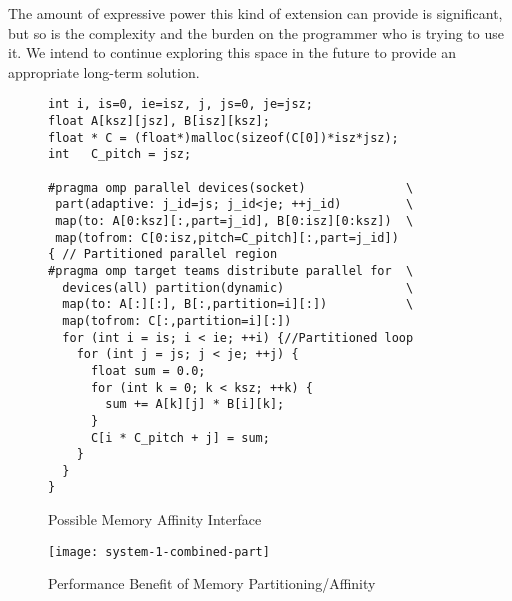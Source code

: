The amount of expressive power this kind of extension can provide is
significant, but so is the complexity and the burden on the programmer who is
trying to use it.  We intend to continue exploring this space in the future to
provide an appropriate long-term solution.

\begin{figure}
  \begin{verbatim}
int i, is=0, ie=isz, j, js=0, je=jsz;
float A[ksz][jsz], B[isz][ksz];
float * C = (float*)malloc(sizeof(C[0])*isz*jsz);
int   C_pitch = jsz;

#pragma omp parallel devices(socket)              \
 part(adaptive: j_id=js; j_id<je; ++j_id)         \
 map(to: A[0:ksz][:,part=j_id], B[0:isz][0:ksz])  \
 map(tofrom: C[0:isz,pitch=C_pitch][:,part=j_id])
{ // Partitioned parallel region
#pragma omp target teams distribute parallel for  \
  devices(all) partition(dynamic)                 \
  map(to: A[:][:], B[:,partition=i][:])           \
  map(tofrom: C[:,partition=i][:])
  for (int i = is; i < ie; ++i) {//Partitioned loop
    for (int j = js; j < je; ++j) {
      float sum = 0.0;
      for (int k = 0; k < ksz; ++k) {
        sum += A[k][j] * B[i][k];
      }
      C[i * C_pitch + j] = sum;
    }
  }
}
\end{verbatim}
\caption{Possible Memory Affinity Interface\label{fig:atsar-gemm}}
\end{figure}

\begin{figure*}[t]
        \texttt{[image: system-1-combined-part]}
        \caption{Performance Benefit of Memory Partitioning/Affinity\label{fig:atsar-perf}}
\end{figure*}


